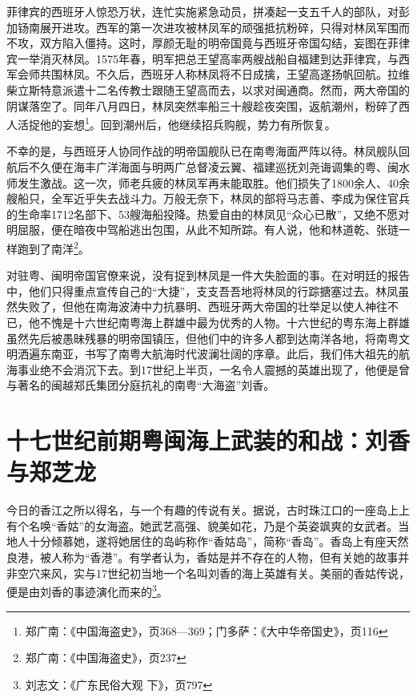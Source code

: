 菲律宾的西班牙人惊恐万状，连忙实施紧急动员，拼凑起一支五千人的部队，对彭加钖南展开进攻。西军的第一次进攻被林凤军的顽强抵抗粉碎，只得对林凤军围而不攻，双方陷入僵持。这时，厚颜无耻的明帝国竟与西班牙帝国勾结，妄图在菲律宾一举消灭林凤。1575年春，明军把总王望高率两艘战船自福建到达菲律宾，与西军会师共围林凤。不久后，西班牙人称林凤将不日成擒，王望高遂扬帆回航。拉维柴立斯特意派遣十二名传教士跟随王望高而去，以求对闽通商。然而，两大帝国的阴谋落空了。同年八月四日，林凤突然率船三十艘趁夜突围，返航潮州，粉碎了西人活捉他的妄想\footnote{郑广南：《中国海盗史》，页368—369；门多萨：《大中华帝国史》，页116}。回到潮州后，他继续招兵购舰，势力有所恢复。

不幸的是，与西班牙人协同作战的明帝国舰队已在南粤海面严阵以待。林凤舰队回航后不久便在海丰广洋海面与明两广总督凌云翼、福建巡抚刘尧诲调集的粤、闽水师发生激战。这一次，师老兵疲的林凤军再未能取胜。他们损失了1800余人、40余艘船只，全军近乎失去战斗力。万般无奈下，林凤的部将马志善、李成为保住官兵的生命率1712名部下、53艘海船投降。热爱自由的林凤见“众心已散”，又绝不愿对明屈服，便在暗夜中驾船逃出包围，从此不知所踪。有人说，他和林道乾、张琏一样跑到了南洋\footnote{郑广南：《中国海盗史》，页237}。

对驻粤、闽明帝国官僚来说，没有捉到林凤是一件大失脸面的事。在对明廷的报告中，他们只得重点宣传自己的“大捷”，支支吾吾地将林凤的行踪搪塞过去。林凤虽然失败了，但他在南海波涛中力抗暴明、西班牙两大帝国的壮举足以使人神往不已，他不愧是十六世纪南粤海上群雄中最为优秀的人物。十六世纪的粤东海上群雄虽然先后被愚昧残暴的明帝国镇压，但他们中的许多人都到达南洋各地，将南粤文明洒遍东南亚，书写了南粤大航海时代波澜壮阔的序章。此后，我们伟大祖先的航海事业绝不会消沉下去。到17世纪上半页，一名令人震撼的英雄出现了，他便是曾与著名的闽越郑氏集团分庭抗礼的南粤“大海盗”刘香。

\section{十七世纪前期粤闽海上武装的和战：刘香与郑芝龙}

今日的香江之所以得名，与一个有趣的传说有关。据说，古时珠江口的一座岛上上有个名唤“香姑”的女海盗。她武艺高强、貌美如花，乃是个英姿飒爽的女武者。当地人十分倾慕她，遂将她居住的岛屿称作“香姑岛”，简称“香岛”。香岛上有座天然良港，被人称为“香港”。有学者认为，香姑是并不存在的人物，但有关她的故事并非空穴来风，实与17世纪初当地一个名叫刘香的海上英雄有关。美丽的香姑传说，便是由刘香的事迹演化而来的\footnote{刘志文：《广东民俗大观 下》，页797}。

